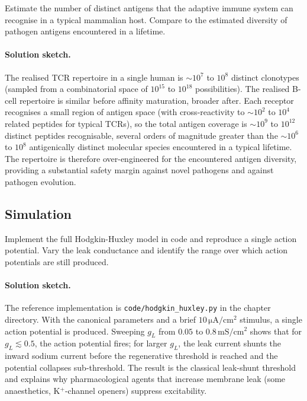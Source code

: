 \begin{exercise}
Estimate the number of distinct antigens that the adaptive immune
system can recognise in a typical mammalian host. Compare to the
estimated diversity of pathogen antigens encountered in a lifetime.
\end{exercise}

\paragraph{Solution sketch.}
The realised TCR repertoire in a single human is $\sim 10^7$ to
$10^8$ distinct clonotypes (sampled from a combinatorial space of
$10^{15}$ to $10^{18}$ possibilities). The realised B-cell repertoire
is similar before affinity maturation, broader after. Each receptor
recognises a small region of antigen space (with cross-reactivity to
$\sim 10^2$ to $10^4$ related peptides for typical TCRs), so the
total antigen coverage is $\sim 10^9$ to $10^{12}$ distinct
peptides recognisable, several orders of magnitude greater than the
$\sim 10^6$ to $10^8$ antigenically distinct molecular species
encountered in a typical lifetime. The repertoire is therefore
over-engineered for the encountered antigen diversity, providing a
substantial safety margin against novel pathogens and against
pathogen evolution.

\subsection*{Simulation}

\begin{exercise}
Implement the full Hodgkin-Huxley model in code and reproduce a
single action potential. Vary the leak conductance and identify the
range over which action potentials are still produced.
\end{exercise}

\paragraph{Solution sketch.}
The reference implementation is \verb|code/hodgkin_huxley.py| in the
chapter directory. With the canonical parameters and a brief
$10\,\si{\micro\ampere}/\text{cm}^2$ stimulus, a single action
potential is produced. Sweeping $g_L$ from $0.05$ to $0.8\,\text{mS}/\text{cm}^2$
shows that for $g_L \lesssim 0.5$, the action potential fires; for
larger $g_L$, the leak current shunts the inward sodium current
before the regenerative threshold is reached and the potential
collapses sub-threshold. The result is the classical leak-shunt
threshold and explains why pharmacological agents that increase
membrane leak (some anaesthetics, K$^+$-channel openers) suppress
excitability.

